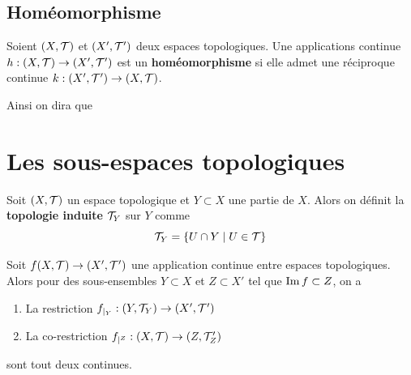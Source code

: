 \subsection{Homéomorphisme}

\begin{definition}[Homéomorphisme]
	Soient $(X, \mathcal T)$ et $(X', \mathcal T')$ deux espaces topologiques. Une applications continue $h : (X, \mathcal T) \to (X', \mathcal T')$ est un \textbf{homéomorphisme} si elle admet une réciproque continue $k : (X', \mathcal T') \to (X, \mathcal T)$. 
	
	Ainsi on dira que
\end{definition}

\section{Les sous-espaces topologiques}
\begin{definition}
	Soit $(X, \mathcal T)$ un espace topologique et $Y \subset X$  une partie de $X$. Alors on définit la \textbf{topologie induite} $\mathcal T_Y$ sur $Y$ comme
	\[
	\mathcal T_Y = \{ U \cap Y \mid U \in \mathcal T\}
	\]
\end{definition}
\begin{lemme}
	Soit $f(X, \mathcal T) \to (X', \mathcal T')$ une application continue entre espaces topologiques. Alors pour des sous-ensembles $Y \subset X$ et $Z \subset X'$ tel que $\operatorname{Im} f \subset Z$, on a
	\begin{enumerate}
		\item La restriction $f_{\mid_Y} : (Y, \mathcal T_Y) \to (X', \mathcal T')$
		\item La co-restriction $f_{\mid^Z} : (X, \mathcal T) \to (Z, \mathcal T_{Z}')$
	\end{enumerate}
	sont tout deux continues.
\end{lemme}
\begin{figure}[H]
	\centering
	\begin{minipage}{0.45\textwidth}
		\centering
	\end{minipage}
	\hfill
	\begin{minipage}{0.45\textwidth}
		\centering
	\end{minipage}
\end{figure}
